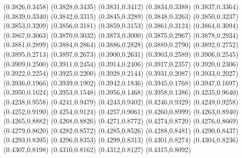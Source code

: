 \PST@Filltriangle(0.3826,0.3458)
\PST@Filltriangle(0.3828,0.3435)
\PST@Filltriangle(0.3831,0.3412)
\PST@Filltriangle(0.3834,0.3388)
\PST@Filltriangle(0.3837,0.3364)
\PST@Filltriangle(0.3839,0.3340)
\PST@Filltriangle(0.3842,0.3315)
\PST@Filltriangle(0.3845,0.3289)
\PST@Filltriangle(0.3848,0.3263)
\PST@Filltriangle(0.3850,0.3237)
\PST@Filltriangle(0.3853,0.3209)
\PST@Filltriangle(0.3856,0.3181)
\PST@Filltriangle(0.3859,0.3153)
\PST@Filltriangle(0.3861,0.3124)
\PST@Filltriangle(0.3864,0.3094)
\PST@Filltriangle(0.3867,0.3063)
\PST@Filltriangle(0.3870,0.3032)
\PST@Filltriangle(0.3873,0.3000)
\PST@Filltriangle(0.3875,0.2967)
\PST@Filltriangle(0.3878,0.2934)
\PST@Filltriangle(0.3881,0.2899)
\PST@Filltriangle(0.3884,0.2864)
\PST@Filltriangle(0.3886,0.2828)
\PST@Filltriangle(0.3889,0.2790)
\PST@Filltriangle(0.3892,0.2752)
\PST@Filltriangle(0.3895,0.2713)
\PST@Filltriangle(0.3897,0.2673)
\PST@Filltriangle(0.3900,0.2631)
\PST@Filltriangle(0.3903,0.2589)
\PST@Filltriangle(0.3906,0.2545)
\PST@Filltriangle(0.3909,0.2500)
\PST@Filltriangle(0.3911,0.2454)
\PST@Filltriangle(0.3914,0.2406)
\PST@Filltriangle(0.3917,0.2357)
\PST@Filltriangle(0.3920,0.2306)
\PST@Filltriangle(0.3922,0.2254)
\PST@Filltriangle(0.3925,0.2200)
\PST@Filltriangle(0.3928,0.2144)
\PST@Filltriangle(0.3931,0.2087)
\PST@Filltriangle(0.3933,0.2027)
\PST@Filltriangle(0.3936,0.1966)
\PST@Filltriangle(0.3939,0.1902)
\PST@Filltriangle(0.3942,0.1836)
\PST@Filltriangle(0.3945,0.1768)
\PST@Filltriangle(0.3947,0.1697)
\PST@Filltriangle(0.3950,0.1624)
\PST@Filltriangle(0.3953,0.1548)
\PST@Filltriangle(0.3956,0.1468)
\PST@Filltriangle(0.3958,0.1386)
\PST@Filltriangle(0.4235,0.9640)
\PST@Filltriangle(0.4238,0.9558)
\PST@Filltriangle(0.4241,0.9479)
\PST@Filltriangle(0.4243,0.9402)
\PST@Filltriangle(0.4246,0.9329)
\PST@Filltriangle(0.4249,0.9258)
\PST@Filltriangle(0.4252,0.9190)
\PST@Filltriangle(0.4254,0.9124)
\PST@Filltriangle(0.4257,0.9061)
\PST@Filltriangle(0.4260,0.8999)
\PST@Filltriangle(0.4263,0.8940)
\PST@Filltriangle(0.4265,0.8882)
\PST@Filltriangle(0.4268,0.8826)
\PST@Filltriangle(0.4271,0.8772)
\PST@Filltriangle(0.4274,0.8720)
\PST@Filltriangle(0.4276,0.8669)
\PST@Filltriangle(0.4279,0.8620)
\PST@Filltriangle(0.4282,0.8572)
\PST@Filltriangle(0.4285,0.8526)
\PST@Filltriangle(0.4288,0.8481)
\PST@Filltriangle(0.4290,0.8437)
\PST@Filltriangle(0.4293,0.8395)
\PST@Filltriangle(0.4296,0.8353)
\PST@Filltriangle(0.4299,0.8313)
\PST@Filltriangle(0.4301,0.8274)
\PST@Filltriangle(0.4304,0.8236)
\PST@Filltriangle(0.4307,0.8198)
\PST@Filltriangle(0.4310,0.8162)
\PST@Filltriangle(0.4312,0.8127)
\PST@Filltriangle(0.4315,0.8092)
